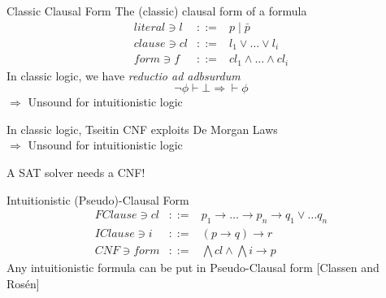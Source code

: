 \documentclass{beamer}
\begin{document}
\begin{frame}{Classic Clausal Form}
  The (classic) clausal form of a formula
  \[
    \begin{array}{lcl}
      \mathit{literal} \ni l &{::=}& p \mid \bar{p} \\
      \mathit{clause} \ni cl &{::=}& l_1 \lor \dots \lor l_i\\
      \mathit{form} \ni  f &{::=}& cl_1 \land \dots \land cl_i
    \end{array}
  \]
    In classic logic, we have \emph{reductio ad adbsurdum}
  \[
    {\neg \phi \vdash \bot} \Rightarrow
    {\vdash \phi}
  \]
  $\Rightarrow$ Unsound for intuitionistic logic\\
  \bigskip
  
  In classic logic, Tseitin CNF exploits De Morgan Laws\\
  $\Rightarrow$ Unsound for intuitionistic logic\\
  \bigskip
  
  A SAT solver needs a CNF!
\end{frame}

\begin{frame}{Intuitionistic (Pseudo)-Clausal Form}
  \[
    \begin{array}{lcl}
      \mathit{FClause}\ni cl&{::=}& p_1 \to \dots \to p_n \to q_1 \lor \dots q_n\\
      \mathit{IClause}\ni i &{::=}& (p \to q) \to r\\
      \mathit{CNF} \ni   form &{::=}& \bigwedge cl \land \bigwedge i \to p
    \end{array}
  \]
  Any intuitionistic formula can be put in Pseudo-Clausal form [Classen and Rosén]\\
\end{frame}
\end{document}
